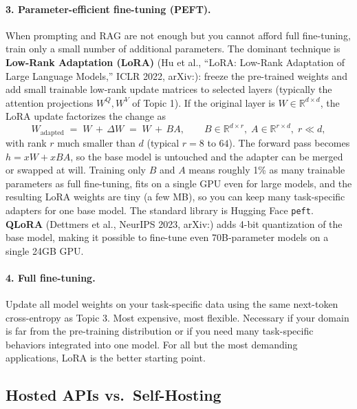 \documentclass[11pt]{article}
\theoremstyle{remark}
\newcommand{\arxiv}[1]{arXiv:\allowbreak #1}
\begin{document}
\paragraph{3. Parameter-efficient fine-tuning (PEFT).}
When prompting and RAG are not enough but you cannot afford full fine-tuning, train only a small number of additional parameters. The dominant technique is \textbf{Low-Rank Adaptation (LoRA)} (Hu et al., ``LoRA: Low-Rank Adaptation of Large Language Models,'' ICLR 2022, \arxiv{2106.09685}): freeze the pre-trained weights and add small trainable low-rank update matrices to selected layers (typically the attention projections \(W^Q, W^V\) of Topic 1). If the original layer is \(W \in \mathbb{R}^{d \times d}\), the LoRA update factorizes the change as
\[
W_{\text{adapted}} \;=\; W \,+\, \Delta W \;=\; W \,+\, B A, \qquad B \in \mathbb{R}^{d \times r},\; A \in \mathbb{R}^{r \times d},\; r \ll d,
\]
with rank \(r\) much smaller than \(d\) (typical \(r = 8\) to \(64\)). The forward pass becomes \(h = xW + xBA\), so the base model is untouched and the adapter can be merged or swapped at will. Training only \(B\) and \(A\) means roughly 1\% as many trainable parameters as full fine-tuning, fits on a single GPU even for large models, and the resulting LoRA weights are tiny (a few MB), so you can keep many task-specific adapters for one base model. The standard library is Hugging Face \texttt{peft}. \textbf{QLoRA} (Dettmers et al., NeurIPS 2023, \arxiv{2305.14314}) adds 4-bit quantization of the base model, making it possible to fine-tune even 70B-parameter models on a single 24GB GPU.

\paragraph{4. Full fine-tuning.}
Update all model weights on your task-specific data using the same next-token cross-entropy as Topic 3. Most expensive, most flexible. Necessary if your domain is far from the pre-training distribution or if you need many task-specific behaviors integrated into one model. For all but the most demanding applications, LoRA is the better starting point.

\subsection{Hosted APIs vs.\ Self-Hosting}
\end{document}
